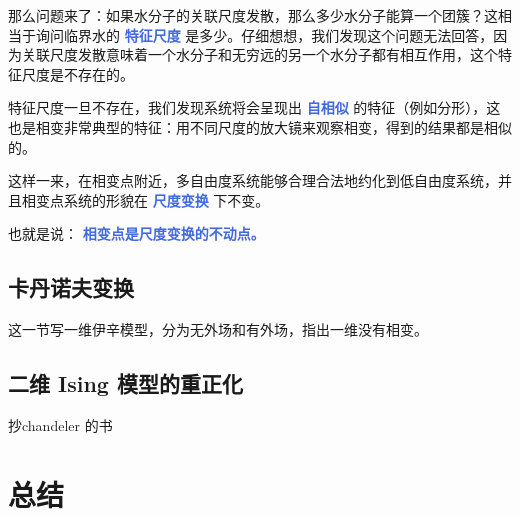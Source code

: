那么问题来了：如果水分子的关联尺度发散，那么多少水分子能算一个团簇？这相当于询问临界水的 \textcolor{RoyalBlue}{\textbf{\kaishu 特征尺度}} 是多少。仔细想想，我们发现这个问题无法回答，因为关联尺度发散意味着一个水分子和无穷远的另一个水分子都有相互作用，这个特征尺度是不存在的。

特征尺度一旦不存在，我们发现系统将会呈现出 \textcolor{RoyalBlue}{\textbf{\kaishu 自相似}} 的特征（例如分形），这也是相变非常典型的特征：用不同尺度的放大镜来观察相变，得到的结果都是相似的。

这样一来，在相变点附近，多自由度系统能够合理合法地约化到低自由度系统，并且相变点系统的形貌在 \textcolor{RoyalBlue}{\textbf{\kaishu 尺度变换}} 下不变。

也就是说： \textcolor{RoyalBlue}{\textbf{\kaishu 相变点是尺度变换的不动点。}}

\subsection{卡丹诺夫变换}

这一节写一维伊辛模型，分为无外场和有外场，指出一维没有相变。

\subsection{二维 Ising 模型的重正化}

抄chandeler 的书

\section{总结}